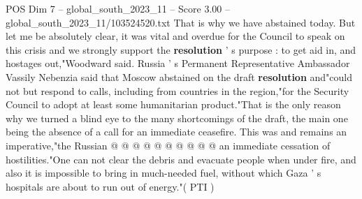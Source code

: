 \begin{textsample}{POS Dim 7 – global\_south\_2023\_11 – Score 3.00 – global\_south\_2023\_11/103524520.txt}
That is why we have abstained today.
But let me be absolutely clear, it was vital and overdue for the Council to speak on this crisis and we strongly support the \textbf{resolution} ' s purpose : to get aid in, and hostages out,"Woodward said.
Russia ' s Permanent Representative Ambassador Vassily Nebenzia said that Moscow abstained on the draft \textbf{resolution} and"could not but respond to calls, including from countries in the region,"for the Security Council to adopt at least some humanitarian product."That is the only reason why we turned a blind eye to the many shortcomings of the draft, the main one being the absence of a call for an immediate ceasefire.
This was and remains an imperative,"the Russian @ @ @ @ @ @ @ @ @ @ an immediate cessation of hostilities."One can not clear the debris and evacuate people when under fire, and also it is impossible to bring in much-needed fuel, without which Gaza ' s hospitals are about to run out of energy."( PTI )

\end{textsample}
